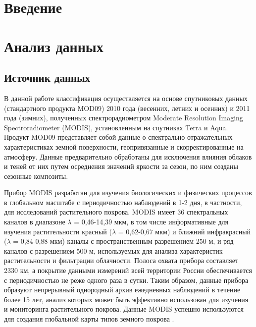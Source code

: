 \documentclass[14pt, a4paper, oneside]{extarticle}
\begin{document}
\tableofcontents
\newpage

\section{Введение}




\newpage

\section{Анализ данных}
\subsection{Источник данных}
В данной работе классификация осуществляется на основе спутниковых данных (стандартного продукта MOD09) 2010 года (весенних, летних и осенних) и 2011 года (зимних), полученных спектрорадиометром Moderate Resolution Imaging Spectroradiometer (MODIS), установленным на спутниках Terra и Aqua. Продукт MOD09 представляет собой данные о спектрально-отражательных характеристиках земной поверхности, геопривязанные и скорректированные на атмосферу. Данные предварительно обработаны для исключения влияния облаков и теней от них путем осреднения значений яркости за сезон, по ним созданы сезонные композиты.

Прибор MODIS разработан для изучения биологических и физических процессов в глобальном масштабе с периодичностью наблюдений в 1-2 дня, в частности, для исследований растительного покрова. MODIS имеет 36 спектральных каналов в диапазоне $\lambda$ = 0,46-14,39 мкм, в том числе информативные для изучения растительности красный ($\lambda$ = 0,62-0,67 мкм) и ближний инфракрасный ($\lambda$ = 0,84-0,88 мкм) каналы с пространственным разрешением 250 м, и ряд каналов с разрешением 500 м, используемых для анализа характеристик растительности и фильтрации облачности. Полоса охвата прибора составляет 2330 км, а покрытие данными измерений всей территории России обеспечивается с периодичностью не реже одного раза в сутки. Таким образом, данные прибора образуют непрерывный однородный архив ежедневных наблюдений в течение более 15 лет, анализ которых может быть эффективно использован для изучения и мониторинга растительного покрова. Данные MODIS успешно используются для создания глобальной карты типов земного покрова \cite{land-cover-mapping-monograph}.
\end{document}
